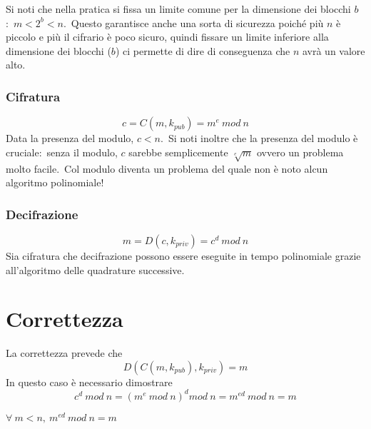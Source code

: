 Si noti che nella pratica si fissa un limite comune per la dimensione dei blocchi $b$:\ $m < 2^b < n$.\
Questo garantisce anche una sorta di sicurezza poiché più $n$ è piccolo e più il cifrario è poco sicuro, quindi fissare un limite inferiore alla dimensione dei blocchi ($b$) ci permette di dire di conseguenza che $n$ avrà un valore alto.\

\subsubsection{Cifratura}

\[ c = C(m, k_{\mathit{pub}}) = m^e\ \mathit{mod}\ n \]
Data la presenza del modulo, $c < n$.\
Si noti inoltre che la presenza del modulo è cruciale:\ senza il modulo, $c$ sarebbe semplicemente $\sqrt[e] m$ ovvero un problema molto facile.\
Col modulo diventa un problema del quale non è noto alcun algoritmo polinomiale!

\subsubsection{Decifrazione}

\[ m = D(c, k_{\mathit{priv}}) = c^d\ \mathit{mod}\ n \]
Sia cifratura che decifrazione possono essere eseguite in tempo polinomiale grazie all'algoritmo delle quadrature successive.\

\section{Correttezza}

La correttezza prevede che
\[D(C(m, k_{\mathit{pub}} ), k_{\mathit{priv}}) = m\]
In questo caso è necessario dimostrare
\[c^d\ \mathit{mod}\ n = (m^e\ \mathit{mod}\ n)^d \mathit{mod}\ n = m^{ed}\ \mathit{mod}\ n = m\]

\begin{theorem}[Correttezza]
    $\forall\ m<n,\ m^{ed}\ \mathit{mod}\ n = m$
\end{theorem}

